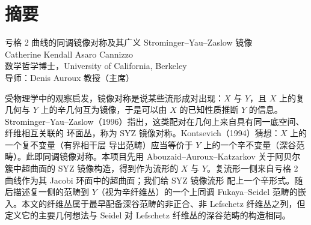 \section*{摘要}

\begin{center}
{\small
亏格 2 曲线的同调镜像对称及其广义 Strominger--Yau--Zaslow 镜像\\[0.4em]
Catherine Kendall Asaro Cannizzo\\
数学哲学博士，University of California, Berkeley\\
导师：Denis Auroux 教授（主席）
}
\end{center}

受物理学中的观察启发，镜像对称是说某些流形成对出现：$X$ 与 $Y$，且 $X$ 上的复几何与
$Y$ 上的辛几何互为镜像，于是可以由 $X$ 的已知性质推断 $Y$ 的信息。
Strominger--Yau--Zaslow（1996）指出，这类配对在几何上来自具有同一底空间、纤维相互关联的
环面丛，称为 SYZ 镜像对称。Kontsevich（1994）猜想：$X$ 上的一个复不变量（有界相干层
导出范畴）应当等价于 $Y$ 上的一个辛不变量（深谷范畴）。此即同调镜像对称。本项目先用
Abouzaid--Auroux--Katzarkov 关于阿贝尔簇中超曲面的 SYZ 镜像构造，得到作为流形的 $X$
与 $Y$。复流形一侧来自亏格 2 曲线作为其 Jacobi 环面中的超曲面；我们给 SYZ 镜像流形
配上一个辛形式。随后描述复一侧的范畴到 $Y$（视为辛纤维丛）的一个上同调
Fukaya--Seidel 范畴的嵌入。本文的纤维丛属于最早配备深谷范畴的非正合、非 Lefschetz
纤维丛之列，但定义它的主要几何想法与 Seidel 对 Lefschetz 纤维丛的深谷范畴的构造相同。




